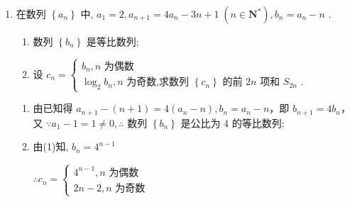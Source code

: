 \begin{enumerate}
    \item 在数列 $\left\{  {a}_{n}\right\}$ 中, ${a}_{1} = 2,{a}_{n + 1} = 4{a}_{n} - {3n} + 1\;\left( {n \in  {\mathbf{N}}^{ * }}\right) ,{b}_{n} = {a}_{n} - n$ .
    \begin{enumerate}
        \item 数列 $\left\{  {b}_{n}\right\}$ 是等比数列;
        \item 设 ${c}_{n} = \left\{  \begin{matrix} {b}_{n},n\text{ 为偶数 } \\  {\log }_{2}{b}_{n},n\text{ 为奇数,求数列 }\left\{  {c}_{n}\right\}  \text{ 的前 }{2n}\text{ 项和 }{S}_{2n}\text{ . } \end{matrix}\right.$
    \end{enumerate}
    \begin{jieda}
        \begin{enumerate}
            \item 由已知得 ${a}_{n + 1} - \left( {n + 1}\right)  = 4\left( {{a}_{n} - n}\right) ,{b}_{n} = {a}_{n} - n$，即 ${b}_{n + 1} = 4{b}_{n}$，又 $\because {a}_{1} - 1 = 1 \neq  0,\therefore$ 数列 $\left\{  {b}_{n}\right\}$ 是公比为 4 的等比数列;
            \item 由(1)知, ${b}_{n} = {4}^{n - 1}$
            
            $\therefore {c}_{n} = \left\{  \begin{matrix} {4}^{n - 1},n\text{ 为偶数 } \\  {2n} - 2,n\text{ 为奇数 } \end{matrix}\right.$
            

\end{enumerate}
\end{jieda}
\end{enumerate}
